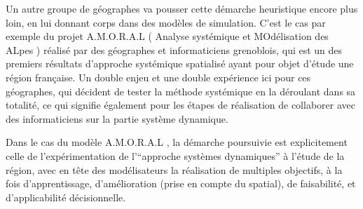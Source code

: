 Un autre groupe de géographes va pousser cette démarche heuristique encore plus loin, en lui donnant corps dans des modèles de simulation. C'est le cas par exemple du projet A.M.O.R.A.L ( Analyse systémique et MOdélisation des ALpes ) réalisé par des géographes et informaticiens grenoblois, qui est un des premiers résultats d'approche systémique spatialisé ayant pour objet d'étude une région française. Un double enjeu et une double expérience ici pour ces géographes, qui décident de tester la méthode systémique en la déroulant dans sa totalité, ce qui signifie également pour les étapes de réalisation de collaborer avec des informaticiens sur la partie système dynamique. \autocite{Guermond1984, LeBerre1987}


Dans le cas du modèle A.M.O.R.A.L \autocite{Durand1983}, la démarche poursuivie est explicitement celle de l'expérimentation de l'\enquote{approche systèmes dynamiques} \autocite{Rosnay1975} à l'étude de la région, avec en tête des modélisateurs la réalisation de multiples objectifs, à la fois d'apprentissage, d'amélioration (prise en compte du spatial), de faisabilité, et d'applicabilité décisionnelle.

